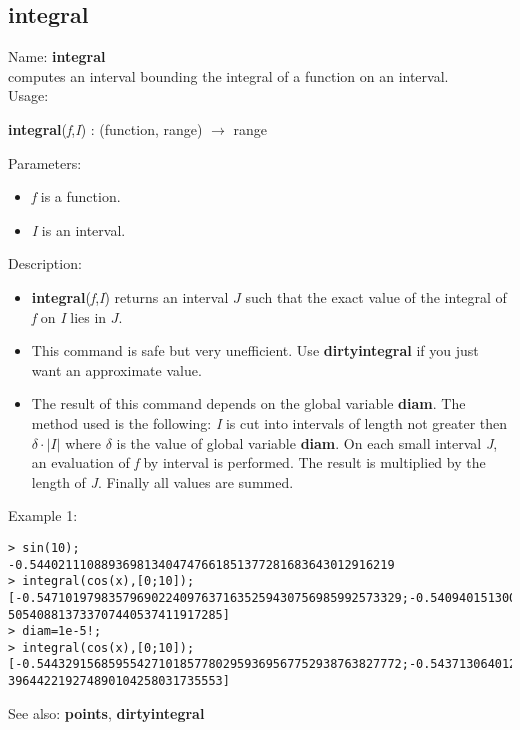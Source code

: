 \subsection{ integral }
\noindent Name: \textbf{integral}\\
computes an interval bounding the integral of a function on an interval.\\

\noindent Usage: 
\begin{center}
\textbf{integral}(\emph{f},\emph{I}) : (\textsf{function}, \textsf{range}) $\rightarrow$ \textsf{range}\\
\end{center}
Parameters: 
\begin{itemize}
\item \emph{f} is a function.
\item \emph{I} is an interval.
\end{itemize}
\noindent Description: \begin{itemize}

\item \textbf{integral}(\emph{f},\emph{I}) returns an interval $J$ such that the exact value of 
   the integral of \emph{f} on \emph{I} lies in $J$.

\item This command is safe but very unefficient. Use \textbf{dirtyintegral} if you just want
   an approximate value.

\item The result of this command depends on the global variable \textbf{diam}.
   The method used is the following: \emph{I} is cut into intervals of length not 
   greater then $\delta \cdot |I|$ where $\delta$ is the value
   of global variable \textbf{diam}.
   On each small interval \emph{J}, an evaluation of \emph{f} by interval is
   performed. The result is multiplied by the length of \emph{J}. Finally all values 
   are summed.
\end{itemize}
\noindent Example 1: 
\begin{center}\begin{minipage}{15cm}\begin{Verbatim}[frame=single]
> sin(10);
-0.544021110889369813404747661851377281683643012916219
> integral(cos(x),[0;10]);
[-0.547101979835796902240976371635259430756985992573329;-0.540940151300131838481
505408813733707440537411917285]
> diam=1e-5!;
> integral(cos(x),[0;10]);
[-0.544329156859554271018577802959369567752938763827772;-0.543713064012499695080
396442219274890104258031735553]
\end{Verbatim}
\end{minipage}\end{center}
See also: \textbf{points}, \textbf{dirtyintegral}
